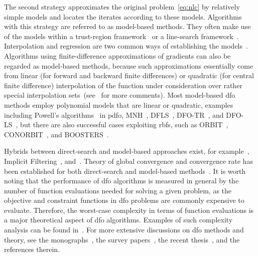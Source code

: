 \documentclass[
    smallextended,  %
    final,        %
]{svjour3}
\begin{document}
The second strategy approximates the original problem~\eqref{eq:nlc} by relatively simple models and locates the iterates according to these models.
Algorithms with this strategy are referred to as model-based methods. They often make use of the models within a trust-region framework~\cite{Conn_Gould_Toint_2000,Conn_Scheinberg_Vicente_2009a,Yuan_2015} or a line-search framework~\cite{Berahas_Byrd_Nocedal_2019,Shi_Etal_2022}.
Interpolation and regression are two common ways of establishing the models~\cite{Powell_2001,Conn_Scheinberg_Vicente_2008a,Conn_Scheinberg_Vicente_2008b,Wild_Regis_Shoemaker_2008,Bandeira_Scheinberg_Vicente_2012,Billups_Larson_Graf_2013,Regis_Wild_2017}.
Algorithms using finite-difference approximations of gradients can also be regarded as model-based
methods, because such approximations essentially come from linear (for forward and backward finite
differences) or quadratic (for central finite difference) interpolation of the function under
consideration over rather special interpolation sets~(see~\cite[\S~1.4.3]{Ragonneau_2022} for more comments).
Most model-based \gls{dfo} methods employ polynomial models that are linear or quadratic, examples including
Powell's algorithms~\cite{Powell_1994,Powell_2002,Powell_2006,Powell_2009} in \gls{pdfo},
MNH~\cite{Wild_2008}, DFLS~\cite{Zhang_Conn_Scheinberg_2010},
DFO-TR~\cite{Bandeira_Scheinberg_Vicente_2012}, and DFO-LS~\cite{Cartis_Etal_2019,Hough_Roberts_2022}, but there are also successful cases exploiting \glspl{rbf}, such as ORBIT~\cite{Wild_Regis_Shoemaker_2008}, CONORBIT~\cite{Regis_Wild_2017}, and BOOSTERS~\cite{Oeuvray_Bierlaire_2009}.

Hybrids between direct-search and model-based approaches exist, for example~\cite{Custodio_Vicente_2007}, Implicit Filtering~\cite[Algorithm~4.7]{Kelley_2011}, and~\cite{Conn_Digabel_2013}.
Theory of global convergence and convergence rate has been established for both direct-search and model-based methods~\cite{Torczon_1997,Conn_Scheinberg_Toint_1997a,Kolda_Lewis_Torczon_2003,Conn_Scheinberg_Vicente_2009a,Powell_2012,Vicente_2013,Dodangeh_Vicente_2016,Garmanjani_Judice_Vicente_2016,Gratton_Royer_Vicente_2020}.
It is worth noting that the performance of \gls{dfo} algorithms is measured in general by the number of function evaluations needed for solving a given problem, as the objective and constraint functions in \gls{dfo} problems are commonly
expensive to evaluate.
Therefore, the worst-case complexity in terms of function evaluations is a major theoretical aspect of \gls{dfo} algorithms.
Examples of such complexity analysis can be found in~\cite{Vicente_2013,Gratton_Etal_2015,Dodangeh_Vicente_2016,Dodangeh_Vicente_Zhang_2016}.
For more extensive discussions on \gls{dfo} methods and theory, see the monographs~\cite{Conn_Scheinberg_Vicente_2009b,Audet_Hare_2017}, the survey
papers~\cite{Rios_Sahinidis_2013,Custodio_Scheinberg_Vicente_2017,Larson_Menickelly_Wild_2019}, the recent thesis~\cite{Ragonneau_2022}, and the references therein.
\end{document}
